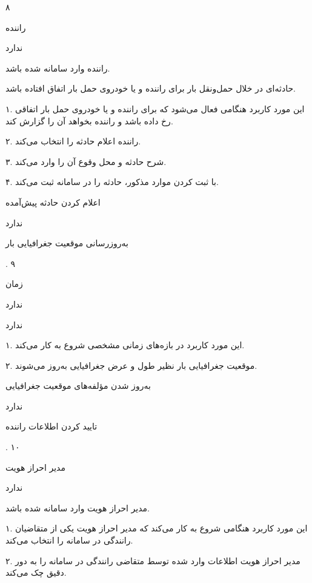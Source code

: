 ۸

راننده

ندارد


راننده وارد سامانه شده باشد.

حادثه‌ای در خلال حمل‌و‌نقل بار برای راننده و یا خودروی حمل‌ بار اتفاق افتاده باشد.


۱. این مورد کاربرد هنگامی فعال می‌شود که برای راننده و یا خودروی حمل بار اتفاقی رخ داده باشد و  راننده بخواهد آن را گزارش کند.

۲. راننده اعلام حادثه را انتخاب می‌کند.

۳. شرح حادثه و محل وقوع آن را وارد می‌کند.

۴. با ثبت کردن موارد مذکور، حادثه را در سامانه ثبت می‌کند.

اعلام کردن حادثه پیش‌آمده

ندارد

\noindent \hrulefill

به‌روزرسانی موقعیت جغرافیایی بار

.
۹

زمان

ندارد

ندارد


۱. این مورد کاربرد در بازه‌های زمانی مشخصی شروع به کار می‌کند.

۲. موقعیت جغرافیایی بار نظیر طول و عرض جغرافیایی به‌روز می‌شوند.

به‌روز شدن مؤلفه‌های موقعیت جغرافیایی	

ندارد

\noindent \hrulefill

تایید کردن اطلاعات راننده

.
۱۰

مدیر احراز هویت

ندارد

مدیر احراز هویت وارد سامانه شده باشد.


۱. این مورد کاربرد هنگامی شروع به کار می‌کند که مدیر احراز هویت یکی از متقاضیان رانندگی در سامانه را انتخاب می‌کند.

۲. مدیر احراز هویت اطلاعات وارد شده توسط متقاضی رانندگی در سامانه را به دور دقیق چک می‌کند.

